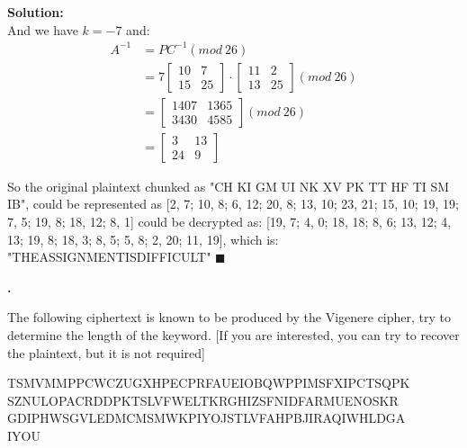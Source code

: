 \documentclass{article}
\newcounter{pcounter}                                   %
\newenvironment{problem}                                %
{                                                       %
    \stepcounter{pcounter}                              %
    \textbf{\arabic{pcounter}.}                         %
}{}                                                     %
\newenvironment{solution}                               %
{\textbf{Solution:} \\}{$\blacksquare$\newline}         %
\begin{document}
\begin{solution}
        And we have $k=-7$ and:
        \begin{align*}
            A^{-1} &= P C^{-1} (mod\ 26) \\
            &=  7
                \begin{bmatrix}
                    10 & 7 \\
                    15 & 25
                \end{bmatrix}
                \cdot
                \begin{bmatrix}
                    11 & 2 \\
                    13 & 25
                \end{bmatrix} (mod\ 26) \\
            &= 
                \begin{bmatrix}
                    1407 & 1365 \\
                    3430 & 4585
                \end{bmatrix} (mod\ 26) \\
            &= 
                \begin{bmatrix}
                    3 & 13 \\
                    24 & 9
                \end{bmatrix}
        \end{align*}

        So the original plaintext chunked as "CH KI GM UI NK XV PK TT HF TI SM IB", could be represented as 
        [2, 7; 10, 8; 6, 12; 20, 8; 13, 10; 23, 21; 15, 10; 19, 19; 7, 5; 19, 8; 18, 12; 8, 1]
        could be decrypted as:
        [19, 7; 4, 0; 18, 18; 8, 6; 13, 12; 4, 13; 19, 8; 18, 3; 8, 5; 5, 8; 2, 20; 11, 19], which is: "THEASSIGNMENTISDIFFICULT"
    \end{solution}

    \begin{problem}
        The following ciphertext is known to be produced by the Vigenere cipher, try to determine the length of the keyword. [If you are interested, you can try to recover the plaintext, but it is not required]

        TSMVMMPPCWCZUGXHPECPRFAUEIOBQWPPIMSFXIPCTSQPK \\
        SZNULOPACRDDPKTSLVFWELTKRGHIZSFNIDFARMUENOSKR \\
        GDIPHWSGVLEDMCMSMWKPIYOJSTLVFAHPBJIRAQIWHLDGA \\
        IYOU

    \end{problem}
    
\end{document}
